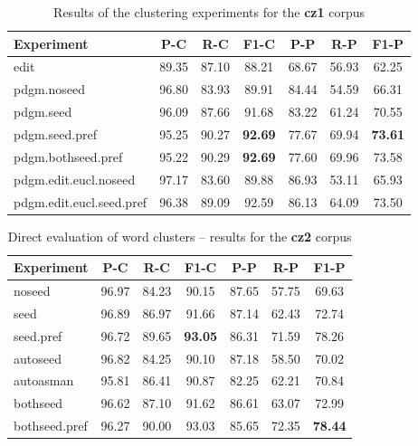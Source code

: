 \begin{table}[hp]
\begin{center}
\begin{tabular}{lcccccc}
\toprule
\bf Experiment & \bf P-C & \bf R-C & \bf F1-C & \bf P-P & \bf R-P & \bf F1-P\\
\midrule
edit & 89.35 & 87.10 & 88.21 & 68.67 & 56.93 & 62.25\\
pdgm.noseed & 96.80 & 83.93 & 89.91 & 84.44 & 54.59 & 66.31\\
pdgm.seed & 96.09 & 87.66 & 91.68 & 83.22 & 61.24 & 70.55\\
pdgm.seed.pref & 95.25 & 90.27 & \bf 92.69 & 77.67 & 69.94 & \bf 73.61\\
pdgm.bothseed.pref & 95.22 & 90.29 & \bf 92.69 & 77.60 & 69.96 & 73.58\\
pdgm.edit.eucl.noseed & 97.17 & 83.60 & 89.88 & 86.93 & 53.11 & 65.93\\
pdgm.edit.eucl.seed.pref & 96.38 & 89.09 & 92.59 & 86.13 & 64.09 & 73.50\\
\bottomrule
\end{tabular}
\end{center}
\caption{\label{table:res:cz10:clust} Results of the clustering experiments for the \textbf{cz1} corpus}
\end{table}

\begin{table}[hp]
\begin{center}
\begin{tabular}{lcccccc}
\toprule
\bf Experiment & \bf P-C & \bf R-C & \bf F1-C & \bf P-P & \bf R-P & \bf F1-P\\
\midrule
noseed & 96.97 & 84.23 & 90.15 & 87.65 & 57.75 & 69.63\\
seed & 96.89 & 86.97 & 91.66 & 87.14 & 62.43 & 72.74\\
seed.pref & 96.72 & 89.65 & \bf 93.05 & 86.31 & 71.59 & 78.26\\
autoseed & 96.82 & 84.25 & 90.10 & 87.18 & 58.50 & 70.02\\
autoasman & 95.81 & 86.41 & 90.87 & 82.25 & 62.21 & 70.84\\
bothseed & 96.62 & 87.10 & 91.62 & 86.61 & 63.07 & 72.99\\
bothseed.pref & 96.27 & 90.00 & 93.03 & 85.65 & 72.35 & \bf 78.44\\
\bottomrule
\end{tabular}
\end{center}
\caption{\label{table:res:cz20:direct} Direct evaluation of word clusters -- results for the \textbf{cz2} corpus }
\end{table}

